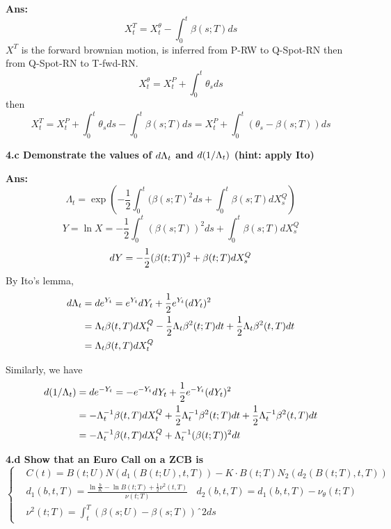 \documentclass[11pt, notitlepage]{article}
\def\\ln{\mathrm{\ln}}
\def\\exp{\mathrm{\exp}}
\def\\max{\mathrm{\max}}
\def\d{\mathnormal{d}}
\begin{document}
\vspace{5mm}
\color{black}
\textbf {Ans:}
$$ X_t^T = X_t^\theta - \int^t_0 \beta(s;T)ds$$
$X^T$ is the forward brownian motion, is inferred from P-RW to Q-Spot-RN then from Q-Spot-RN to T-fwd-RN.
$$X_t^\theta = X_t^P + \int^t_0 \theta_s ds$$
then $$X_t^T = X_t^P + \int^t_0 \theta_s ds - \int^t_0 \beta(s;T)ds = X_t^P + \int^t_0(\theta_s - \beta(s;T))ds$$


\vspace{10mm}
\color{red}
\bfseries
4.c Demonstrate the values of $\d \Lambda_t$ and $\d(1/\Lambda_t)$ (hint: apply Ito)
\mdseries

\vspace{5mm}
\color{black}
\textbf {Ans:}
$$ \Lambda_t = \exp({-\frac{1}{2}\int^t_0(\beta(s;T)^2 ds + \int^t_0 \beta(s;T) dX_s^Q}) $$
$$ Y = \ln X = -\frac{1}{2}\int^t_0(\beta(s;T))^2 ds + \int^t_0 \beta(s;T) dX_s^Q$$
$$\d Y = -\frac{1}{2}(\beta(t;T))^2 + \beta(t;T)dX_s^Q$$
By Ito's lemma,
\begin{equation*}
\begin{aligned}
\d \Lambda_t  &= \d e^{Y_t} = e^{Y_t}\d Y_t+\frac{1}{2} e^{Y_t} (\d Y_t)^2\\
& = \Lambda_t \beta (t,T)dX_t^Q - \frac{1}{2} \Lambda_t \beta^2(t;T)dt + \frac{1}{2} \Lambda_t \beta^2(t,T)dt\\
& = \Lambda_t \beta(t,T)dX_t^Q
\end{aligned}
\end{equation*}

Similarly, we have
\begin{equation*}
\begin{aligned}
\d (1/\Lambda_t)  &= \d e^{-Y_t} = - e^{-Y_t}\d Y_t+\frac{1}{2} e^{-Y_t} (\d Y_t)^2\\
& = - \Lambda_t^{-1} \beta (t,T)dX_t^Q + \frac{1}{2} \Lambda_t^{-1} \beta^2(t;T)dt + \frac{1}{2} \Lambda_t^{-1} \beta^2(t,T)dt\\
& = - \Lambda_t^{-1} \beta(t,T)dX_t^Q + \Lambda_t^{-1} (\beta(t;T))^2 \d t
\end{aligned}
\end{equation*}

\vspace{10mm}
\color{red}
\bfseries
4.d Show that an Euro Call on a ZCB is
\begin{equation*}
\left \{
  \begin{aligned}
    &C(t) = B(t;U)N(d_1(B(t;U), t, T)) - K\cdot B(t;T)N_2(d_2(B(t;T), t,T))\\
    &d_1(b,t,T) = \frac{\ln \frac{b}{K} - \ln B(t;T) + \frac{1}{2}\nu^2(t,T)}{\nu(t;T)}  ~~~~d_2(b,t,T) = d_1(b,t,T)-\nu_\theta(t;T) \\
    &\nu^2(t;T) = \int_t^T (\beta(s;U) - \beta(s;T))ˆ2 ds
  \end{aligned} \right.
\end{equation*}
\mdseries
\end{document}

